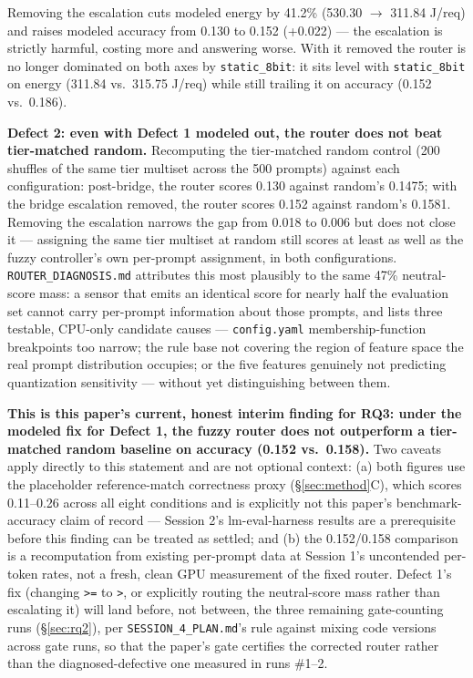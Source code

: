 \documentclass[conference]{IEEEtran}
\begin{document}
Removing the escalation cuts modeled energy by 41.2\% (530.30
$\rightarrow$ 311.84 J/req) and raises modeled accuracy from 0.130 to
0.152 (+0.022) --- the escalation is strictly harmful, costing more and
answering worse. With it removed the router is no longer dominated on
both axes by \texttt{static\_8bit}: it sits level with
\texttt{static\_8bit} on energy (311.84 vs.\ 315.75 J/req) while still
trailing it on accuracy (0.152 vs.\ 0.186).

\textbf{Defect 2: even with Defect 1 modeled out, the router does not
beat tier-matched random.} Recomputing the tier-matched random control
(200 shuffles of the same tier multiset across the 500 prompts) against
each configuration: post-bridge, the router scores 0.130 against
random's 0.1475; with the bridge escalation removed, the router scores
0.152 against random's 0.1581. Removing the escalation narrows the gap
from 0.018 to 0.006 but does not close it --- assigning the same tier
multiset at random still scores at least as well as the fuzzy
controller's own per-prompt assignment, in both configurations.
\texttt{ROUTER\_DIAGNOSIS.md} attributes this most plausibly to the same
47\% neutral-score mass: a sensor that emits an identical score for
nearly half the evaluation set cannot carry per-prompt information about
those prompts, and lists three testable, CPU-only candidate causes ---
\texttt{config.yaml} membership-function breakpoints too narrow; the rule
base not covering the region of feature space the real prompt
distribution occupies; or the five features genuinely not predicting
quantization sensitivity --- without yet distinguishing between them.

\textbf{This is this paper's current, honest interim finding for RQ3:
under the modeled fix for Defect 1, the fuzzy router does not outperform
a tier-matched random baseline on accuracy (0.152 vs.\ 0.158).} Two
caveats apply directly to this statement and are not optional context:
(a) both figures use the placeholder reference-match correctness proxy
(\S\ref{sec:method}C), which scores 0.11--0.26 across all eight
conditions and is explicitly not this paper's benchmark-accuracy claim of
record --- Session 2's lm-eval-harness results are a prerequisite before
this finding can be treated as settled; and (b) the 0.152/0.158
comparison is a recomputation from existing per-prompt data at Session
1's uncontended per-token rates, not a fresh, clean GPU measurement of
the fixed router. Defect 1's fix (changing \texttt{>=} to \texttt{>}, or
explicitly routing the neutral-score mass rather than escalating it) will
land before, not between, the three remaining gate-counting runs
(\S\ref{sec:rq2}), per \texttt{SESSION\_4\_PLAN.md}'s rule against mixing
code versions across gate runs, so that the paper's gate certifies the
corrected router rather than the diagnosed-defective one measured in runs
\#1--2.
\end{document}
